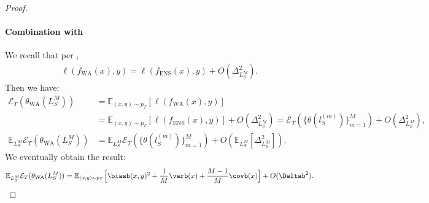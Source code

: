 \begin{proof}
    \paragraph{Combination with }
    We recall that per ,
    \begin{align*}
        \ell\left(f_{\text{WA}}(x), y\right) = \ell\left(f_{\text{ENS}}(x) , y\right) + O(\Delta_{L_S^M}^2).
    \end{align*}
    Then we have:
    \begin{align*}
        \mathcal{E}_T(\theta_{\text{WA}}(L_S^M))&=\mathbb{E}_{(x,y) \sim p_T}[\ell(f_{\text{WA}}(x),y)]\\
        &=\mathbb{E}_{(x,y) \sim p_T}[\ell(f_{\text{ENS}}(x),y)] + O(\Delta_{L_S^M}^2) = \mathcal{E}_T(\{\theta(l_S^{(m)})\}_{m=1}^M) + O(\Delta_{L_S^M}^2), \\
        \mathbb{E}_{L_S^M} \mathcal{E}_T(\theta_{\text{WA}}(L_S^M))&=\mathbb{E}_{L_S^M}\mathcal{E}_T(\{\theta(l_S^{(m)})\}_{m=1}^M) + O(\mathbb{E}_{L_S^M}[\Delta_{L_S^M}^2]).
    \end{align*}
    We eventually obtain the result:
    \begin{align*}
        \mathbb{E}_{L_S^M}\mathcal{E}_T(\theta_{\text{WA}}(L_S^M)) = \mathbb{E}_{(x,y)\sim p_T}\Big[\biasb(x,y)^{2}+\frac{1}{M} \varb(x)+\frac{M-1}{M} \covb(x)\Big] + O(\Deltab^2).
    \end{align*}
\end{proof}%




